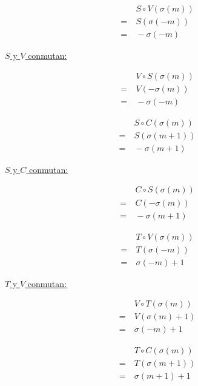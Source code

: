 \begin{center}
			\begin{multicols}{3}
				\begin{align*}
				&\ S\circ V(\sigma(m))\\
				=&\ S(\sigma(-m))\\
				=&\ -\sigma(-m)
				\end{align*}
				
				\underline{$S$ y $V$ conmutan:}
				
				\begin{align*}
				&\ V\circ S(\sigma(m))\\
				=&\ V(-\sigma(m))\\
				=&\ -\sigma(-m)
				\end{align*}
			\end{multicols}
			
			\begin{multicols}{3}
				\begin{align*}
				&\ S\circ C(\sigma(m))\\
				=&\ S(\sigma(m+1))\\
				=&\ -\sigma(m+1)
				\end{align*}
				
				\underline{$S$ y $C$ conmutan:}
				
				\begin{align*}
				&\ C\circ S(\sigma(m))\\
				=&\ C(-\sigma(m))\\
				=&\ -\sigma(m+1)
				\end{align*}
			\end{multicols}
			
			\begin{multicols}{3}
				\begin{align*}
				&\ T\circ V(\sigma(m))\\
				=&\ T(\sigma(-m))\\
				=&\ \sigma(-m)+1
				\end{align*}
				
				\underline{$T$ y $V$ conmutan:}
				
				\begin{align*}
				&\ V\circ T(\sigma(m))\\
				=&\ V(\sigma(m)+1)\\
				=&\ \sigma(-m)+1
				\end{align*}
			\end{multicols}
			
			\begin{multicols}{3}
				\begin{align*}
				&\ T\circ C(\sigma(m))\\
				=&\ T(\sigma(m+1))\\
				=&\ \sigma(m+1)+1
				\end{align*}
				

\end{multicols}
\end{center}
